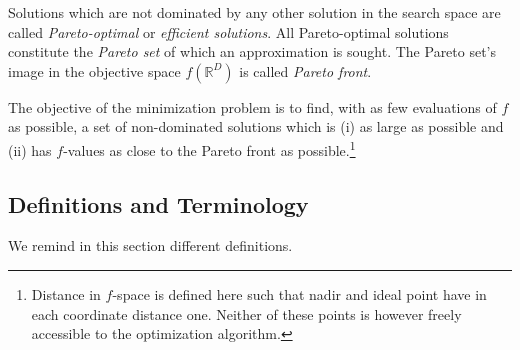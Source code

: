 \documentclass[letterpaper,12pt,english]{article}
\begin{document}
Solutions which are not dominated by any other solution in the search
space are called \emph{Pareto-optimal} or \emph{efficient solutions}. All
Pareto-optimal solutions constitute the \emph{Pareto set} of which an
approximation is sought. The Pareto set's image in the
objective space \(f(\mathbb{R}^D)\) is called \emph{Pareto front}.

The objective of the minimization problem is to find, with as few evaluations
of \(f\) as possible, a set of non-dominated solutions which is (i) as large
as possible and (ii) has \(f\)-values as close to the Pareto front as possible.\footnote[1]{
Distance in \(f\)-space is defined here such that nadir and ideal point
have in each coordinate distance one. Neither of these points is however
freely accessible to the optimization algorithm.
}


\subsection{Definitions and Terminology}
\label{index:definitions-and-terminology}
We remind in this section different definitions.
\end{document}
